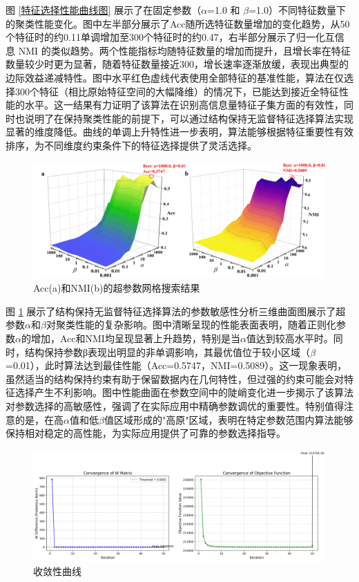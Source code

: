 \documentclass[12pt,a4paper,UTF8]{article}
\begin{document}
 图 \ref{特征选择性能曲线图} 展示了在固定参数（$\alpha$=1.0 和 $\beta$=1.0）不同特征数量下的聚类性能变化。图中左半部分展示了Acc随所选特征数量增加的变化趋势，从50个特征时的约0.11单调增加至300个特征时的约0.47，右半部分展示了归一化互信息 NMI 的类似趋势。两个性能指标均随特征数量的增加而提升，且增长率在特征数量较少时更为显著，随着特征数量接近300，增长速率逐渐放缓，表现出典型的边际效益递减特性。图中水平红色虚线代表使用全部特征的基准性能，算法在仅选择300个特征（相比原始特征空间的大幅降维）的情况下，已能达到接近全特征性能的水平。这一结果有力证明了该算法在识别高信息量特征子集方面的有效性，同时也说明了在保持聚类性能的前提下，可以通过结构保持无监督特征选择算法实现显著的维度降低。曲线的单调上升特性进一步表明，算法能够根据特征重要性有效排序，为不同维度约束条件下的特征选择提供了灵活选择。
 

 
  \begin{figure}[H]
 	\centering
 	\includegraphics[width=1.0\textwidth]{./results/compare}
 	\caption{Acc(a)和NMI(b)的超参数网格搜索结果}
 	\label{超参数网格搜索结果}
 \end{figure}
 图 \ref{超参数网格搜索结果} 展示了结构保持无监督特征选择算法的参数敏感性分析三维曲面图展示了超参数$\alpha$和$\beta$对聚类性能的复杂影响。图中清晰呈现的性能表面表明，随着正则化参数$\alpha$的增加，Acc和NMI均呈现显著上升趋势，特别是当$\alpha$值达到较高水平时。同时，结构保持参数β表现出明显的非单调影响，其最优值位于较小区域（$\beta$=0.01），此时算法达到最佳性能（Acc=0.5747，NMI=0.5089）。这一现象表明，虽然适当的结构保持约束有助于保留数据内在几何特性，但过强的约束可能会对特征选择产生不利影响。图中性能曲面在参数空间中的陡峭变化进一步揭示了该算法对参数选择的高敏感性，强调了在实际应用中精确参数调优的重要性。特别值得注意的是，在高$\alpha$值和低$\beta$值区域形成的"高原"区域，表明在特定参数范围内算法能够保持相对稳定的高性能，为实际应用提供了可靠的参数选择指导。
 
   \begin{figure}[H]
 	\centering
 	\includegraphics[width=1.0\textwidth]{./results/convergence_best_params_a1000.0_b0.01}
 	\caption{收敛性曲线}
 	\label{收敛性曲线图}
 \end{figure}
 
\end{document}
